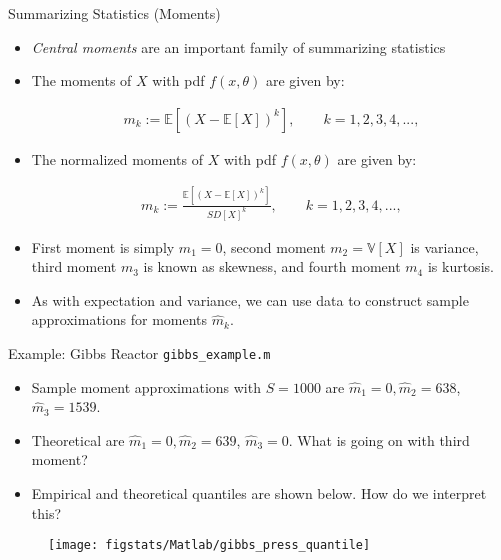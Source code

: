 \documentclass[handout,9pt]{beamer}
\begin{document}
\begin{frame}{Summarizing Statistics (Moments)}

\begin{itemize}
 \setlength{\itemsep}{5pt}
\item {\em Central moments} are an important family of summarizing statistics

\item The moments of $X$ with pdf $f(x,\theta)$ are given by:
\begin{block}{}
\begin{align*}
m_k:=\mathbb{E}[(X-\mathbb{E}[X])^k], \qquad k=1,2,3,4,...,
\end{align*}
\end{block}
\item The normalized moments of $X$ with pdf $f(x,\theta)$ are given by:
\begin{block}{}
\begin{align*}
m_k:=\frac{\mathbb{E}[(X-\mathbb{E}[X])^k]}{SD[X]^k}, \qquad k=1,2,3,4,...,
\end{align*}
\end{block}

\item First moment is simply $m_1=0$, second moment $m_2=\mathbb{V}[X]$ is variance, third moment $m_3$ is known as skewness, and fourth moment  $m_4$ is kurtosis. 

\item As with expectation and variance, we can use data to construct sample approximations for moments $\hat{m}_k$. 

\end{itemize}

\end{frame}

\begin{frame}{Example: Gibbs Reactor \footnotesize{\texttt{gibbs\_example.m}}}
\begin{itemize}
\item Sample moment approximations with $S=1000$ are $\hat{m}_1=0,\hat{m}_2=638$, $\hat{m}_3=1539$.
\item Theoretical are $\hat{m}_1=0,\hat{m}_2=639$, $\hat{m}_3=0$. What is going on with third moment?
\item Empirical and theoretical quantiles are shown below. How do we interpret this? 
\end{itemize}
\begin{figure}[!htb]
    \centering
	\texttt{[image: figstats/Matlab/gibbs\_press\_quantile]}
\end{figure}
\end{frame}
\end{document}
